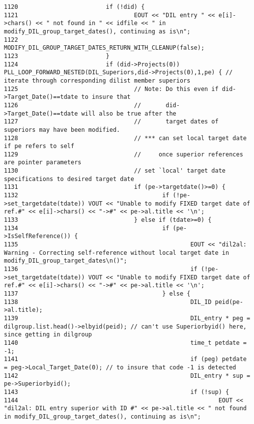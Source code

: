 \begin{verbatim}
1120                         if (!did) {
1121                                 EOUT << "DIL entry " << e[i]->chars() << " not found in " << idfile << " in modify_DIL_group_target_dates(), continuing as is\n";
1122                                 MODIFY_DIL_GROUP_TARGET_DATES_RETURN_WITH_CLEANUP(false);
1123                         }
1124                         if (did->Projects(0)) PLL_LOOP_FORWARD_NESTED(DIL_Superiors,did->Projects(0),1,pe) { // iterate through corresponding dilist member superiors
1125                                 // Note: Do this even if did->Target_Date()==tdate to insure that
1126                                 //       did->Target_Date()==tdate will also be true after the
1127                                 //       target dates of superiors may have been modified.
1128                                 // *** can set local target date if pe refers to self
1129                                 //     once superior references are pointer parameters
1130                                 // set `local' target date specifications to desired target date
1131                                 if (pe->targetdate()>=0) { 
1132                                         if (!pe->set_targetdate(tdate)) VOUT << "Unable to modify FIXED target date of ref.#" << e[i]->chars() << "->#" << pe->al.title << '\n';
1133                                 } else if (tdate>=0) {
1134                                         if (pe->IsSelfReference()) {
1135                                                 EOUT << "dil2al: Warning - Correcting self-reference without local target date in modify_DIL_group_target_dates\n()";
1136                                                 if (!pe->set_targetdate(tdate)) VOUT << "Unable to modify FIXED target date of ref.#" << e[i]->chars() << "->#" << pe->al.title << '\n';
1137                                         } else {
1138                                                 DIL_ID peid(pe->al.title);
1139                                                 DIL_entry * peg = dilgroup.list.head()->elbyid(peid); // can't use Superiorbyid() here, since getting in dilgroup
1140                                                 time_t petdate = -1;
1141                                                 if (peg) petdate = peg->Local_Target_Date(0); // to insure that code -1 is detected
1142                                                 DIL_entry * sup = pe->Superiorbyid();
1143                                                 if (!sup) {
1144                                                         EOUT << "dil2al: DIL entry superior with ID #" << pe->al.title << " not found in modify_DIL_group_target_dates(), continuing as is\n";

\end{verbatim}
